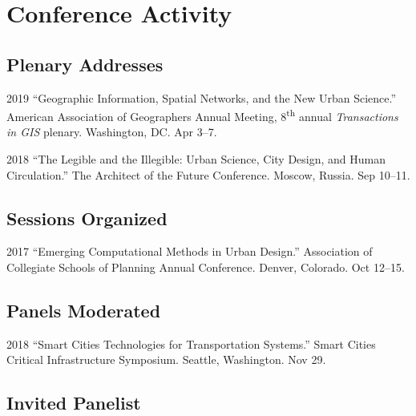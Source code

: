 \documentclass[12pt,letterpaper]{report}
\begin{document}
	\section*{Conference Activity}

	\subsection*{Plenary Addresses}

	\begin{tablist}

		\item[2019] \tab \enquote{Geographic Information, Spatial Networks, and the New Urban Science.} American Association of Geographers Annual Meeting, 8\textsuperscript{th} annual \emph{Transactions in GIS} plenary. Washington, DC. Apr 3--7.

		\item[2018] \tab \enquote{The Legible and the Illegible: Urban Science, City Design, and Human Circulation.} The Architect of the Future Conference. Moscow, Russia. Sep 10--11.

	\end{tablist}

	\subsection*{Sessions Organized}

	\begin{tablist}

		\item[2017] \tab \enquote{Emerging Computational Methods in Urban Design.} Association of Collegiate Schools of Planning Annual Conference. Denver, Colorado. Oct 12--15.

	\end{tablist}

	\subsection*{Panels Moderated}

	\begin{tablist}

		\item[2018] \tab \enquote{Smart Cities Technologies for Transportation Systems.} Smart Cities Critical Infrastructure Symposium. Seattle, Washington. Nov 29.

	\end{tablist}

	\subsection*{Invited Panelist}
\end{document}
